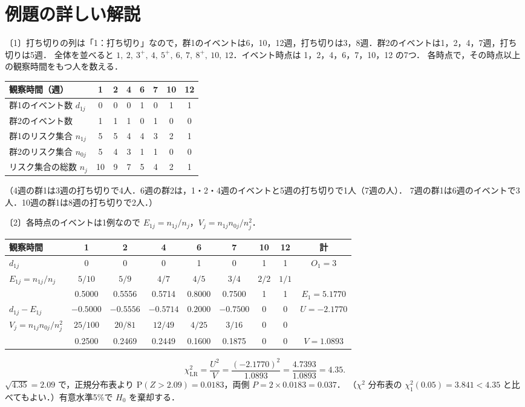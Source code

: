 \documentclass[a4paper,11pt,openany]{ltjsbook}
\newenvironment{kaitou}[1]{%
  \par\medskip\noindent
  \begin{tcolorbox}[enhanced,breakable,colback=bkgray!3,colframe=bkgray!60,boxrule=0.4pt,
    left=4pt,right=4pt,top=2pt,bottom=2pt,arc=1pt,
    title={\cref{#1}の解答},fonttitle=\bfseries\small,coltitle=white,colbacktitle=bkgray!80]}%
  {\end{tcolorbox}\par}
\newcommand{\Prob}{\mathrm{P}}
\begin{document}
\section{例題の詳しい解説}\label{sec:m02-kaisetsu}
\begin{kaitou}{reidai:m02-1}
〔1〕打ち切りの列は「1：打ち切り」なので，群1のイベントは6，10，12週，打ち切りは3，8週．群2のイベントは1，2，4，7週，打ち切りは5週．
全体を並べると $1,\ 2,\ 3^+,\ 4,\ 5^+,\ 6,\ 7,\ 8^+,\ 10,\ 12$．イベント時点は 1，2，4，6，7，10，12 の7つ．
各時点で，その時点以上の観察時間をもつ人を数える．
\begin{center}\small
\begin{tabular}{@{}lccccccc@{}}
\toprule
観察時間（週） & 1 & 2 & 4 & 6 & 7 & 10 & 12\\
\midrule
群1のイベント数 $d_{1j}$ & 0 & 0 & 0 & 1 & 0 & 1 & 1\\
群2のイベント数 & 1 & 1 & 1 & 0 & 1 & 0 & 0\\
群1のリスク集合 $n_{1j}$ & 5 & 5 & 4 & 4 & 3 & 2 & 1\\
群2のリスク集合 $n_{0j}$ & 5 & 4 & 3 & 1 & 1 & 0 & 0\\
リスク集合の総数 $n_j$ & 10 & 9 & 7 & 5 & 4 & 2 & 1\\
\bottomrule
\end{tabular}
\end{center}
（4週の群1は3週の打ち切りで4人．6週の群2は，1・2・4週のイベントと5週の打ち切りで1人（7週の人）．
7週の群1は6週のイベントで3人．10週の群1は8週の打ち切りで2人．）

〔2〕各時点のイベントは1例なので $E_{1j}=n_{1j}/n_j$，$V_j=n_{1j}n_{0j}/n_j^2$．
\begin{center}\small
\begin{tabular}{@{}lcccccccc@{}}
\toprule
観察時間 & 1 & 2 & 4 & 6 & 7 & 10 & 12 & 計\\
\midrule
$d_{1j}$ & 0 & 0 & 0 & 1 & 0 & 1 & 1 & $O_1=3$\\
$E_{1j}=n_{1j}/n_j$ & $5/10$ & $5/9$ & $4/7$ & $4/5$ & $3/4$ & $2/2$ & $1/1$ & \\
 & 0.5000 & 0.5556 & 0.5714 & 0.8000 & 0.7500 & 1 & 1 & $E_1=5.1770$\\
$d_{1j}-E_{1j}$ & $-0.5000$ & $-0.5556$ & $-0.5714$ & $0.2000$ & $-0.7500$ & 0 & 0 & $U=-2.1770$\\
$V_j=n_{1j}n_{0j}/n_j^2$ & $25/100$ & $20/81$ & $12/49$ & $4/25$ & $3/16$ & 0 & 0 & \\
 & 0.2500 & 0.2469 & 0.2449 & 0.1600 & 0.1875 & 0 & 0 & $V=1.0893$\\
\bottomrule
\end{tabular}
\end{center}
\[
\chi^2_{\mathrm{LR}}=\frac{U^2}{V}=\frac{(-2.1770)^2}{1.0893}=\frac{4.7393}{1.0893}=4.35 .
\]
$\sqrt{4.35}=2.09$ で，正規分布表より $\Prob(Z>2.09)=0.0183$，両側 $P=2\times0.0183=0.037$．
（$\chi^2$ 分布表の $\chi^2_1(0.05)=3.841<4.35$ と比べてもよい．）有意水準5\%で $H_0$ を棄却する．


\end{kaitou}
\end{document}
